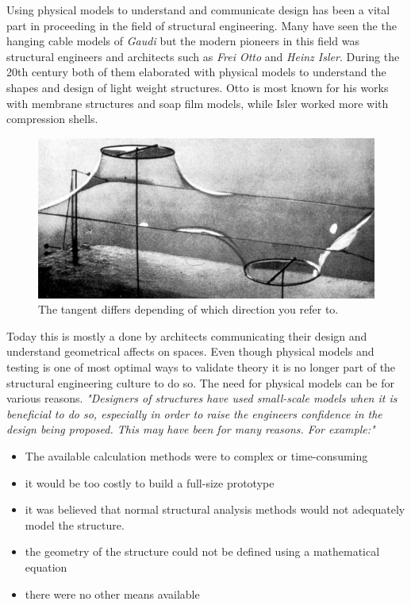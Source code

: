 Using physical models to understand and communicate design has been a vital part in proceeding in the field of structural engineering. Many have seen the the hanging cable models of \textit{Gaudi} but the modern pioneers in this field was structural engineers and architects such as \textit{Frei Otto} and \textit{Heinz Isler}. During the 20th century both of them elaborated with physical models to understand the shapes and design of light weight structures. Otto is most known for his works with membrane structures and soap film models, while Isler worked more with compression shells.\cite{ref:Isler}
\begin{figure}[H]
\centering
\includegraphics[width=0.6\linewidth ]{figure/Theory/Soap.jpg}
\caption{The tangent differs depending of which direction you refer to. }
\end{figure}

Today this is mostly a done by architects communicating their design and understand geometrical affects on spaces. Even though physical models and testing is one of most optimal ways to validate theory it is no longer part of the structural engineering culture to do so. The need for physical models can be for various reasons.\textit{ 
"Designers of structures have used small-scale models when it is beneficial to do so, especially in order to raise the engineers confidence in the design being proposed. This may have been for many reasons. For example:"}  \cite{ref:ShellOpt}

\begin{itemize}
\item The available calculation methods were to complex or time-consuming
\item it would be too costly to build a full-size prototype
\item it was believed that normal structural analysis methods would not adequately model the structure.
\item the geometry of the structure could not be defined using a mathematical equation
\item there were no other means available
\end{itemize}





